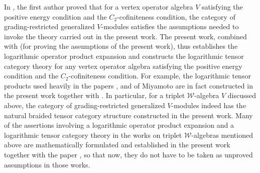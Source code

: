 \documentclass[12pt]{article}
\begin{document}
In \cite{H13}, the first author proved that for a vertex operator
algebra $V$ satisfying the positive energy condition and the
$C_{2}$-cofiniteness condition, the category of grading-restricted
generalized $V$-modules satisfies the assumptions needed to invoke the
theory carried out in the present work. The present work, combined
with \cite{H13} (for proving the assumptions of the present work),
thus establishes the logarithmic operator product expansion and
constructs the logarithmic tensor category theory for any vertex
operator algebra satisfying the positive energy condition and the
$C_{2}$-cofiniteness condition.  For example, the logarithmic tensor
products used heavily in the papers \cite{M3}, \cite{M4} and \cite{M5}
of Miyamoto are in fact constructed in the present work together with
\cite{H13}.  In particular, for a triplet $\mathcal{W}$-algebra $V$
discussed above, the category of grading-restricted generalized
$V$-modules indeed has the natural braided tensor category structure
constructed in the present work.  Many of the assertions involving a
logarithmic operator product expansion and a logarithmic tensor
category theory in the works on triplet $\mathcal{W}$-algebras
mentioned above are mathematically formulated and established in the
present work together with the paper \cite{H13}, so that now, they do
not have to be taken as unproved assumptions in those works.
\end{document}
